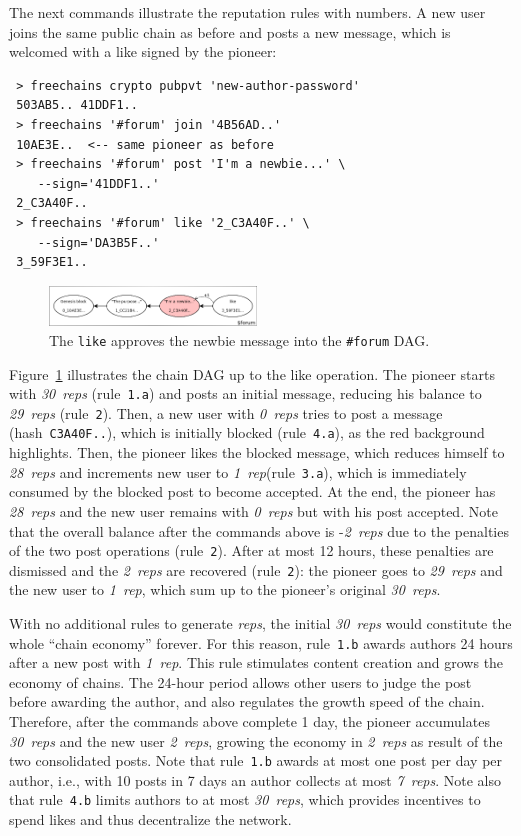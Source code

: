 \documentclass[10pt,journal,compsoc]{IEEEtran}
\newcommand{\reps}     {\emph{reps}\xspace}
\newcommand{\onerep}   {\emph{1~rep}\xspace}
\newcommand{\nreps}[1] {\emph{#1~reps\xspace}}
\begin{document}
The next commands illustrate the reputation rules with numbers.
A new user joins the same public chain as before and posts a new message, which
is welcomed with a like signed by the pioneer:

{\footnotesize
\begin{verbatim}
 > freechains crypto pubpvt 'new-author-password'
 503AB5.. 41DDF1..
 > freechains '#forum' join '4B56AD..'
 10AE3E..  <-- same pioneer as before
 > freechains '#forum' post 'I'm a newbie...' \
    --sign='41DDF1..'
 2_C3A40F..
 > freechains '#forum' like '2_C3A40F..' \
    --sign='DA3B5F..'
 3_59F3E1..
\end{verbatim}
}

\begin{figure}[ht]
\centering
\includegraphics[width=0.49\textwidth]{forum.png}
\caption{
    The \texttt{like} approves the newbie message into the \texttt{\#forum} DAG.
}
\label{fig.forum}
\end{figure}

Figure~\ref{fig.forum} illustrates the chain DAG up to the like operation.
The pioneer starts with \nreps{30} (rule~\texttt{1.a}) and posts an initial
message, reducing his balance to \nreps{29} (rule~\texttt{2}).
Then, a new user with \nreps{0} tries to post a message
(hash~\texttt{C3A40F..}), which is initially blocked (rule~\texttt{4.a}), as
the red background highlights.
Then, the pioneer likes the blocked message, which reduces himself to
\nreps{28} and increments new user to \onerep (rule~\texttt{3.a}), which is
immediately consumed by the blocked post to become accepted.
At the end, the pioneer has \nreps{28} and the new user remains with \nreps{0}
but with his post accepted.
Note that the overall balance after the commands above is -\nreps{2} due to the
penalties of the two post operations (rule~\texttt{2}).
After at most 12 hours, these penalties are dismissed and the \nreps{2} are
recovered (rule~\texttt{2}):
    the pioneer goes to \nreps{29} and the new user to \onerep, which sum up to
    the pioneer's original \nreps{30}.

With no additional rules to generate \reps, the initial \nreps{30} would
constitute the whole ``chain economy'' forever.
For this reason, rule~\texttt{1.b} awards authors 24 hours after a new post
with \onerep.
This rule stimulates content creation and grows the economy of chains.
The 24-hour period allows other users to judge the post before awarding the
author, and also regulates the growth speed of the chain.
Therefore, after the commands above complete 1 day, the pioneer accumulates
\nreps{30} and the new user \nreps{2}, growing the economy in \nreps{2} as
result of the two consolidated posts.
Note that rule~\texttt{1.b} awards at most one post per day per author, i.e.,
with 10 posts in 7 days an author collects at most \nreps{7}.
Note also that rule~\texttt{4.b} limits authors to at most \nreps{30}, which
provides incentives to spend likes and thus decentralize the network.
\end{document}
